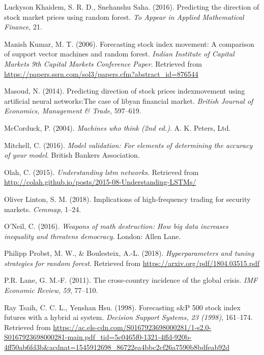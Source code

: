 \documentclass[]{DissertateUSU}
\begin{document}
\leavevmode\hypertarget{ref-saha2016}{}%
Luckyson Khaidem, S. R. D., Snehanshu Saha. (2016). Predicting the
direction of stock market prices using random forest. \emph{To Appear in
Applied Mathematical Finance}, 21.

\leavevmode\hypertarget{ref-ManishKumar}{}%
Manish Kumar, M. T. (2006). Forecasting stock index movement: A
comparison of support vector machines and random forest. \emph{Indian
Institute of Capital Markets 9th Capital Markets Conference Paper}.
Retrieved from
\url{https://papers.ssrn.com/sol3/papers.cfm?abstract_id=876544}

\leavevmode\hypertarget{ref-najeb}{}%
Masoud, N. (2014). Predicting direction of stock prices indexmovement
using artificial neural networks:The case of libyan financial market.
\emph{British Journal of Economics, Management \& Trade}, 597--619.

\leavevmode\hypertarget{ref-pamelamachines}{}%
McCorduck, P. (2004). \emph{Machines who think (2nd ed.)}. A. K. Peters,
Ltd.

\leavevmode\hypertarget{ref-modeldef}{}%
Mitchell, C. (2016). \emph{Model validation: For elements of determining
the accuracy of your model}. British Bankers Association.

\leavevmode\hypertarget{ref-LSTMteoria}{}%
Olah, C. (2015). \emph{Understanding lstm networks}. Retrieved from
\url{http://colah.github.io/posts/2015-08-Understanding-LSTMs/}

\leavevmode\hypertarget{ref-HFT}{}%
Oliver Linton, S. M. (2018). Implications of high-frequency trading for
security markets. \emph{Cemmap}, 1--24.

\leavevmode\hypertarget{ref-biascredit}{}%
O'Neil, C. (2016). \emph{Weapons of math destruction: How big data
increases inequality and threatens democracy}. London: Allen Lane.

\leavevmode\hypertarget{ref-tuningRF}{}%
Philipp Probst, M. W., \& Boulesteix, A.-L. (2018).
\emph{Hyperparameters and tuning strategies for random forest}.
Retrieved from \url{https://arxiv.org/pdf/1804.03515.pdf}

\leavevmode\hypertarget{ref-crisisreasons3}{}%
P.R. Lane, G. M.-F. (2011). The cross-country incidence of the global
crisis. \emph{IMF Economic Review}, \emph{59}, 77--110.

\leavevmode\hypertarget{ref-Tsaih1998}{}%
Ray Tsaih, C. C. L., Yenshan Hsu. (1998). Forecasting s\&P 500 stock
index futures with a hybrid ai system. \emph{Decision Support Systems,
23 (1998)}, 161--174. Retrieved from
\url{https://ac.els-cdn.com/S0167923698000281/1-s2.0-S0167923698000281-main.pdf_tid=5c0465f0-1321-4ffd-920b-4ff50ab6fd3b\&acdnat=1545912698_86722ea4bbc2cf26a7590b8bdfeab92d}
\end{document}
